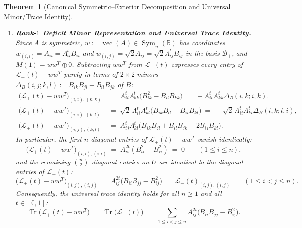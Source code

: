 \documentclass[11pt,a4paper]{article}
\theoremstyle{plain}
\newtheorem{theorem}{Theorem}[section]
\theoremstyle{definition}
\theoremstyle{remark}
\DeclareMathOperator{\Tr}{Tr}
\DeclareMathOperator{\Sym}{Sym}
\DeclareMathOperator{\vecop}{vec}
\begin{document}
\begin{theorem}[Canonical Symmetric--Exterior Decomposition and Universal Minor/Trace Identity]
\begin{enumerate}[label=(\alph*)]
  \begin{equation}\label{eq:duality}
    \mathcal{L}_+^{\mathrm{off}}(t) \;=\; \mathcal{L}_U + M_U, \qquad \mathcal{L}_-(t) \;=\; \mathcal{L}_U - M_U,
  \end{equation}
  and since $\mathcal{L}_U, M_U \ge 0$ entrywise,
  \begin{equation}\label{eq:entrywise_dom}
    \big|(\mathcal{L}_-(t))_{\alpha,\beta}\big| \;\le\; (\mathcal{L}_+^{\mathrm{off}}(t))_{\alpha,\beta} \qquad \forall \alpha, \beta \in U.
  \end{equation}
  \item \textbf{Rank-$1$ Deficit Minor Representation and Universal Trace Identity:} Since $A$ is symmetric, $w := \vecop(A) \in \Sym_n(\mathbb{R})$ has coordinates $w_{(i,i)} = A_{ii} = A_{ii}^t B_{ii}$ and $w_{(i,j)} = \sqrt{2} A_{ij} = \sqrt{2} A_{ij}^t B_{ij}$ in the basis $\mathcal{B}_+$, and $M(1) = w w^T \oplus 0$. Subtracting $w w^T$ from $\mathcal{L}_+(t)$ expresses every entry of $\mathcal{L}_+(t) - w w^T$ purely in terms of $2 \times 2$ minors $\Delta_B(i,j;k,l) := B_{ik}B_{jl} - B_{il}B_{jk}$ of $B$:
  \begin{align}
    \big(\mathcal{L}_+(t) - w w^T\big)_{(i,i),(k,k)} &\;=\; A_{ii}^t A_{kk}^t\big(B_{ik}^2 - B_{ii}B_{kk}\big) \;=\; -A_{ii}^t A_{kk}^t \Delta_B(i,k;i,k), \label{eq:diff_ii_kk}\\
    \big(\mathcal{L}_+(t) - w w^T\big)_{(i,i),(k,l)} &\;=\; \sqrt{2}\,A_{ii}^t A_{kl}^t\big(B_{ik}B_{il} - B_{ii}B_{kl}\big) \;=\; -\sqrt{2}\,A_{ii}^t A_{kl}^t \Delta_B(i,k;l,i), \label{eq:diff_ii_kl}\\
    \big(\mathcal{L}_+(t) - w w^T\big)_{(i,j),(k,l)} &\;=\; A_{ij}^t A_{kl}^t\big(B_{ik}B_{jl} + B_{il}B_{jk} - 2 B_{ij}B_{kl}\big). \label{eq:diff_ij_kl}
  \end{align}
  In particular, the first $n$ diagonal entries of $\mathcal{L}_+(t) - w w^T$ vanish identically:
  \[
    \big(\mathcal{L}_+(t) - w w^T\big)_{(i,i),(i,i)} \;=\; A_{ii}^{2t}(B_{ii}^2 - B_{ii}^2) \;=\; 0 \qquad (1 \le i \le n),
  \]
  and the remaining $\binom{n}{2}$ diagonal entries on $U$ are identical to the diagonal entries of $\mathcal{L}_-(t)$:
  \[
    \big(\mathcal{L}_+(t) - w w^T\big)_{(i,j),(i,j)} \;=\; A_{ij}^{2t}\big(B_{ii}B_{jj} - B_{ij}^2\big) \;=\; \mathcal{L}_-(t)_{(i,j),(i,j)} \qquad (1 \le i < j \le n).
  \]
  Consequently, the universal trace identity holds for all $n \ge 1$ and all $t \in [0,1]$:
  \begin{equation}\label{eq:universal_trace}
    \boxed{\Tr\big(\mathcal{L}_+(t) - w w^T\big) \;=\; \Tr\big(\mathcal{L}_-(t)\big) \;=\; \sum_{1 \le i < j \le n} A_{ij}^{2t}\big(B_{ii}B_{jj} - B_{ij}^2\big).}
  \end{equation}
\end{enumerate}
\end{theorem}
\end{document}
